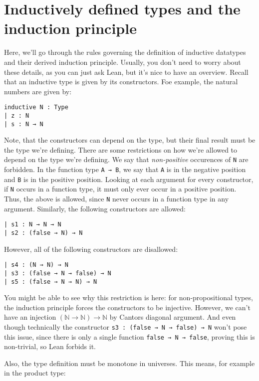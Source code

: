 \documentclass[a4paper, 12pt]{article}
\newcommand{\N}{\mathbb{N}}
\newcommand{\lean}[1]{\texttt{#1}}
\theoremstyle{changedot}
\theoremstyle{changedotbreak}
\theoremstyle{nonumberplain}
\begin{document}
\printbibliography


\appendix
\section{Inductively defined types and the induction principle}\label{sec:ind}
Here, we'll go through the rules governing the definition of inductive datatypes and their derived induction principle. Usually, you don't need to worry about these details, as you can just ask Lean, but it's nice to have an overview. Recall that an inductive type is given by its constructors. Foe example, the natural numbers are given by:

\begin{verbatim}
inductive N : Type
| z : N
| s : N → N 
\end{verbatim}

Note, that the constructors can depend on the type, but their final result must be the type we're defining. There are some restrictions on how we're allowed to depend on the type we're defining. We say that \textit{non-positive} occurences of \lean{N} are forbidden. In the function type \lean{A → B}, we say that \lean{A} is in the negative position and \lean{B} is in the positive position. Looking at each argument for every constructor, if \lean{N} occurs in a function type, it must only ever occur in a positive position. Thus, the above is allowed, since \lean{N} never occurs in a function type in any argument. Similarly, the following constructors are allowed:
\begin{verbatim}
| s1 : N → N → N
| s2 : (false → N) → N
\end{verbatim}

However, all of the following constructors are disallowed:

\begin{verbatim}
| s4 : (N → N) → N
| s3 : (false → N → false) → N
| s5 : (false → N → N) → N
\end{verbatim}

You might be able to see why this restriction is here: for non-propositional types, the induction principle forces the constructors to be injective. However, we can't have an injection $(\N \to \N) \to \N$ by Cantors diagonal argument. And even though technically the constructor \lean{s3 : (false → N → false) → N} won't pose this issue, since there is only a single function \lean{false → N → false}, proving this is non-trivial, so Lean forbids it.

Also, the type definition must be monotone in universes. This means, for example in the product type:
\end{document}
